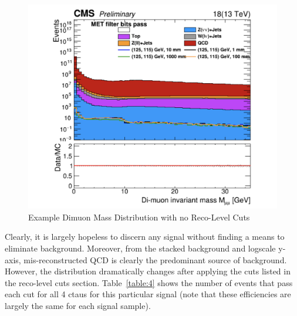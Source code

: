 \documentclass{article}
\begin{document}
\begin{figure}[H]
    \centering
    \includegraphics[width=12cm]{NoCuts.png}
    \caption{Example Dimuon Mass Distribution with no Reco-Level Cuts} 
    \label{fig:16}
\end{figure}
\par
Clearly, it is largely hopeless to discern any signal without finding a means to eliminate background. Moreover, from the stacked background and logscale y-axis, mis-reconstructed QCD is clearly the predominant source of background. However, the distribution dramatically changes after applying the cuts listed in the reco-level cuts section. Table~\ref{table:4} shows the number of events that pass each cut for all 4 ctaus for this particular signal (note that these efficiencies are largely the same for each signal sample). 
\end{document}

